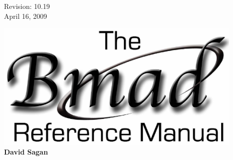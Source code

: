 \thispagestyle{empty}

\begin{flushright}
\large
  Revision: 10.19 \\
  April 16, 2009 \\
\end{flushright}

\vfill

{
\begin{center}
\includegraphics[width=12cm]{bmad-ref-manual.eps} \\
\vskip 0.3in
\huge\bf David Sagan
\end{center}
}

\vfill
\break

